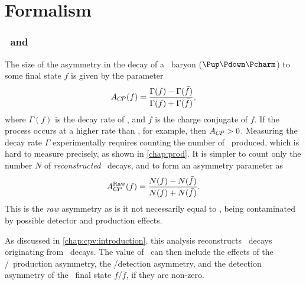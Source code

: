 \chapter{Formalism}
\label{chap:cpv:theory}

\subsection{\texorpdfstring{\ACP\ and \dACP}{ACP and delta ACP}}
\label{chap:cpv:theory:acp}

The size of the asymmetry in the decay of a \PLambdac\ baryon 
($\Pup\Pdown\Pcharm$) to some final state $f$ is given by the parameter \ACP\
\begin{equation}
  A_{C\!P}(f) = \frac{\Gamma(f) - \Gamma(\bar{f})}{\Gamma(f) + \Gamma(\bar{f})},
  \label{eqn:cpv:theory:acp}
\end{equation}
where $\Gamma(f)$ is the decay rate of , and $\bar{f}$ is 
the charge conjugate of $f$.\footnotemark
If the process  occurs at a higher rate than 
\decay{\APLambdac}{\bar{f}}, for example, then $A_{C\!P} > 0$.
Measuring the decay rate $\Gamma$ experimentally requires counting the number 
of \PLambdac\ produced, which is hard to measure precisely, as shown in 
\cref{chap:prod}.
It is simpler to count only the number $N$ of \emph{reconstructed} \PLambdac\ 
decays, and to form an asymmetry parameter as
\begin{equation}
  A_{C\!P}^{\textnormal{Raw}}(f) = \frac{N(f) - N(\bar{f})}{N(f) + N(\bar{f})}.
  \label{eqn:cpv:theory:araw}
\end{equation}
This is the \emph{raw} asymmetry as is it not necessarily equal to \ACP, being 
contaminated by possible detector and production effects.

As discussed in \cref{chap:cpv:introduction}, this analysis reconstructs 
\PLambdac\ decays originating from \ 
decays.
The value of \ARaw\ can then include the effects of the \PLambdab/\APLambdab\ 
production asymmetry, the \Pmuon/\APmuon detection asymmetry, and the detection 
asymmetry of the \PLambdac\ final state $f$/$\bar{f}$, if they are non-zero.

